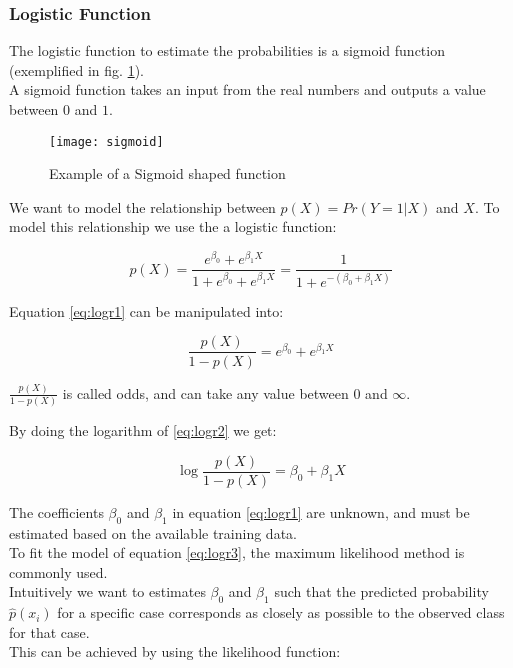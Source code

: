 \subsubsection{Logistic Function}
The logistic function to estimate the probabilities is a sigmoid function (exemplified in fig. \ref{fig:sigmoid}). \\
A sigmoid function takes an input from the real numbers and outputs a value between $0$ and $1$.

\begin{figure}[H]
	\centering
	\texttt{[image: sigmoid]}
	\caption{Example of a Sigmoid shaped function}
	\label{fig:sigmoid}
\end{figure}

We want to model the relationship between $p(X) = Pr(Y = 1|X)$ and $X$. To model this relationship we use the a logistic function:

\begin{equation} \label{eq:logr1}
p(X) = \frac{e^{\beta_{0}} + e^{\beta_{1}X}}{1+ e^{\beta_{0}} + e^{\beta_{1}X}} = \frac{1}{1 + e^{-({\beta_{0} + \beta_{1}X})}}
\end{equation} 

Equation \ref{eq:logr1} can be manipulated into: 

\begin{equation} \label{eq:logr2}
\frac{p(X)}{1 - p(X)} = e^{\beta_{0}} + e^{\beta_{1}X}
\end{equation} 

$\frac{p(X)}{1 - p(X)}$ is called odds, and can take any value between $0$ and $\infty$.

By doing the logarithm of \ref{eq:logr2} we get:

\begin{equation} \label{eq:logr3}
\log{\frac{p(X)}{1 - p(X)}} = \beta_{0} + \beta_{1}X
\end{equation} 

The coefficients $\beta_{0}$ and $\beta_{1}$ in equation \ref{eq:logr1} are unknown, and must be estimated based on the available training data. \\
To fit the model of equation \ref{eq:logr3}, the maximum likelihood method is commonly used. \\
Intuitively we want to estimates $\beta_{0}$ and $\beta_{1}$ such that the predicted probability ${\hat{p}}(x_i)$ for a specific case corresponds as closely as possible to the observed class for that case.\\
This can be achieved by using the likelihood function:

